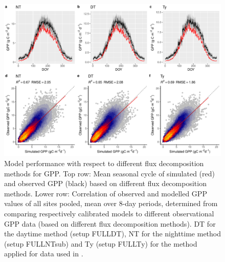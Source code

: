 \documentclass{myreport}
\begin{document}
 \begin{figure}[!ht]
\includegraphics[width=\textwidth]{fig/meandoy_modobs_gpp_data.pdf}
    \caption{Model performance with respect to different flux decomposition methods for GPP. Top row: Mean seasonal cycle of simulated (red) and observed GPP (black) based on different flux decomposition methods. Lower row: Correlation of observed and modelled GPP values of all sites pooled, mean over 8-day periods, determined from comparing respectively calibrated models to different observational GPP data (based on different flux decomposition methods). DT for the daytime method (setup FULL\textunderscore DT), NT for the nighttime method (setup FULL\textunderscore NTsub) and Ty (setup FULL\textunderscore Ty) for the method applied for data used in \citet{wang17rs}.}
    \label{fig:season3}
\end{figure}




\end{document}
